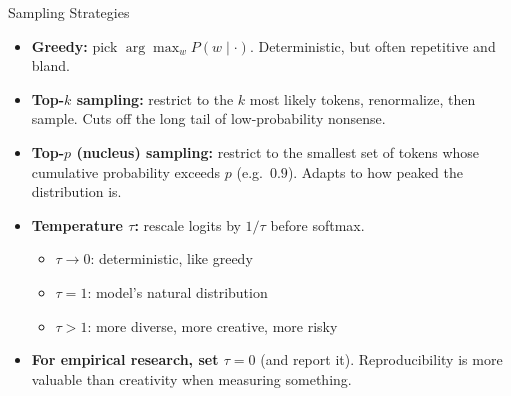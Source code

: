 \begin{frame}{Sampling Strategies}
\begin{itemize}
\item \textbf{Greedy:} pick $\arg\max_w P(w \mid \cdot)$. Deterministic, but often repetitive and bland.

\medskip
\item \textbf{Top-$k$ sampling:} restrict to the $k$ most likely tokens, renormalize, then sample. Cuts off the long tail of low-probability nonsense.

\medskip
\item \textbf{Top-$p$ (nucleus) sampling:} restrict to the smallest set of tokens whose cumulative probability exceeds $p$ (e.g.\ $0.9$). Adapts to how peaked the distribution is.

\medskip
\item \textbf{Temperature $\tau$:} rescale logits by $1/\tau$ before softmax.
\begin{itemize}
    \item $\tau \rightarrow 0$: deterministic, like greedy
    \item $\tau = 1$: model's natural distribution
    \item $\tau > 1$: more diverse, more creative, more risky
\end{itemize}

\medskip
\item \textbf{For empirical research, set $\tau = 0$} (and report it). Reproducibility is more valuable than creativity when measuring something.
\end{itemize}
\end{frame}

